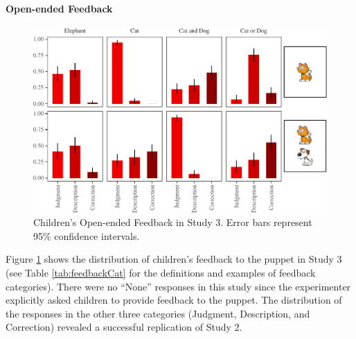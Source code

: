 \documentclass[floatsintext,man]{apa6}
\theoremstyle{definition}
\theoremstyle{definition}
\theoremstyle{definition}
\theoremstyle{remark}
\begin{document}
\paragraph{Open-ended Feedback}\label{open-ended-feedback}

\begin{figure}
\centering
\includegraphics{figs/feedbackStudy3-1.pdf}
\caption{\label{fig:feedbackStudy3}Children's Open-ended Feedback in Study
3. Error bars represent 95\% confidence intervals.}
\end{figure}

Figure \ref{fig:feedbackStudy3} shows the distribution of children's
feedback to the puppet in Study 3 (see Table \ref{tab:feedbackCat} for
the definitions and examples of feedback categories). There were no
\enquote{None} responses in this study since the experimenter explicitly
asked children to provide feedback to the puppet. The distribution of
the responses in the other three categories (Judgment, Description, and
Correction) revealed a successful replication of Study 2.
\end{document}
